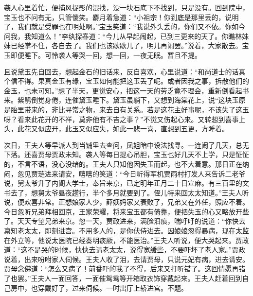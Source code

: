 \begin{parag}
    袭人心里着忙，便捕风捉影的混找，没一块石底下不找到，只是没有。回到院中，宝玉也不问有无，只管傻笑。麝月着急道：“小祖宗！你到底是那里丢的，说明了，我们就是受罪也在明处啊。”宝玉笑道：“我说外头丢的，你们又不依。你如今问我，我知道么！”李纨探春道：“今儿从早起闹起，已到三更来的天了。你瞧林妹妹已经掌不住，各自去了。我们也该歇歇儿了，明儿再闹罢。”说着，大家散去。宝玉即便睡下。可怜袭人等哭一回，想一回，一夜无眠。暂且不提。
\end{parag}


\begin{parag}
    且说黛玉先自回去，想起金石的旧话来，反自喜欢，心里说道：“和尚道士的话真个信不得。果真金玉有缘，宝玉如何能把这玉丢了呢。或者因我之事，拆散他们的金玉，也未可知。”想了半天，更觉安心，把这一天的劳乏竟不理会，重新倒看起书来。紫鹃倒觉身倦，连催黛玉睡下。黛玉虽躺下，又想到海棠花上，说“这块玉原是胎里带来的，非比寻常之物，来去自有关系。若是这花主好事呢，不该失了这玉呀？看来此花开的不祥，莫非他有不吉之事？”不觉又伤起心来。又转想到喜事上头，此花又似应开，此玉又似应失，如此一悲一喜，直想到五更，方睡着。
\end{parag}


\begin{parag}
    次日，王夫人等早派人到当铺里去查问，凤姐暗中设法找寻。一连闹了几天，总无下落。还喜贾母贾政未知。袭人等每日提心吊胆，宝玉也好几天不上学，只是怔怔的，不言不语，没心没绪的。王夫人只知他因失玉而起，也不大着意。那日正在纳闷，忽见贾琏进来请安，嘻嘻的笑道：“今日听得军机贾雨村打发人来告诉二老爷说，舅太爷升了内阁大学士，奉旨来京，已定明年正月二十日宣麻。有三百里的文书去了，想舅太爷昼夜趱行，半个多月就要到了。侄儿特来回太太知道。”王夫人听说，便欢喜非常。正想娘家人少，薛姨妈家又衰败了，兄弟又在外任，照应不着。今日忽听兄弟拜相回京，王家荣耀，将来宝玉都有倚靠，便把失玉的心又略放开些了。天天专望兄弟来京。忽一天，贾政进来，满脸泪痕，喘吁吁的说道：“你快去禀知老太太，即刻进宫。不用多人的，是你伏侍进去。因娘娘忽得暴病，现在太监在外立等，他说太医院已经奏明痰厥，不能医治。”王夫人听说，便大哭起来。贾政道：“这不是哭的时候，快快去请老太太，说得宽缓些，不要吓坏了老人家。”贾政说着，出来吩咐家人伺候。王夫人收了泪，去请贾母，只说元妃有病，进去请安。贾母念佛道：“怎么又病了！前番吓的我了不得，后来又打听错了。这回情愿再错了也罢。”王夫人一面回答，一面催鸳鸯等开箱取衣饰穿戴起来。王夫人赶着回到自己房中，也穿戴好了，过来伺候。一时出厅上轿进宫。不题。
\end{parag}


